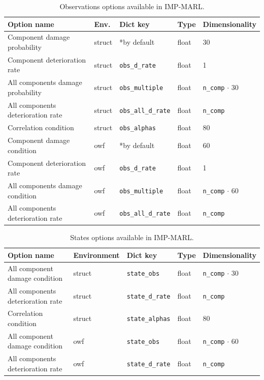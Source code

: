 \begin{table}
\centering
\caption{Observations options available in IMP-MARL.}
\label{tab:obs_desc}
\begin{tabular}{lllll}
\toprule
Option name & Env. & Dict key & Type &  Dimensionality  \\
\midrule
Component damage probability & struct & *by default & float & 30   \\ 
Component deterioration rate & struct & \texttt{obs\_d\_rate} & float & 1    \\
All components damage probability & struct & \texttt{obs\_multiple} & float & \texttt{n\_comp} $\cdot$ 30   \\ 
All components deterioration rate & struct & \texttt{obs\_all\_d\_rate} & float &  \texttt{n\_comp}    \\
Correlation condition & struct & \texttt{obs\_alphas} & float & 80    \\
\hline
Component damage condition & owf & *by default & float & 60   \\ 
Component deterioration rate & owf & \texttt{obs\_d\_rate} & float & 1    \\
All components damage condition & owf & \texttt{obs\_multiple} & float &  \texttt{n\_comp} $\cdot$ 60  \\ 
All components deterioration rate & owf & \texttt{obs\_all\_d\_rate} & float & \texttt{n\_comp}    \\
\bottomrule
\end{tabular}
\end{table}

\begin{table}
\centering
\caption{States options available in IMP-MARL.}
\label{tab:states_desc}
\begin{tabular}{lllll}
\toprule
Option name & Environment & Dict key & Type & Dimensionality  \\
\midrule
All component damage condition & struct & \texttt{state\_obs} & float & \texttt{n\_comp} $\cdot$ 30   \\ 
All components deterioration rate & struct &  \texttt{state\_d\_rate} & float & \texttt{n\_comp}    \\
Correlation condition & struct &  \texttt{state\_alphas} & float & 80    \\
\hline
All component damage condition & owf & \texttt{state\_obs} & float & \texttt{n\_comp} $\cdot$ 60   \\ 
All components deterioration rate & owf & \texttt{state\_d\_rate} & float & \texttt{n\_comp}    \\
\bottomrule
\end{tabular}
\end{table}

